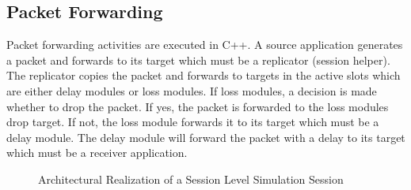 \subsection{Packet Forwarding}
\label{sec:session-pktforward}
Packet forwarding activities are executed in C++.  A source application 
generates a packet and forwards to its target which must be a replicator 
(session helper).  The replicator copies the packet and forwards 
to targets in the active slots which are either delay modules or loss modules. If loss modules, a decision is made whether to drop the packet.
If yes, the packet is forwarded to the loss modules drop target.  If not,
the loss module forwards it to its target which must be a delay module.
The delay module will forward the packet with a delay to its target which
must be a receiver application.
\begin{figure}[tb]
  \caption{Architectural Realization of a Session Level Simulation Session}
  \label{fig:session}
\end{figure}

\endinput

### Local Variables:
### mode: latex
### comment-column: 60
### backup-by-copying-when-linked: t
### file-precious-flag: nil
### End:
